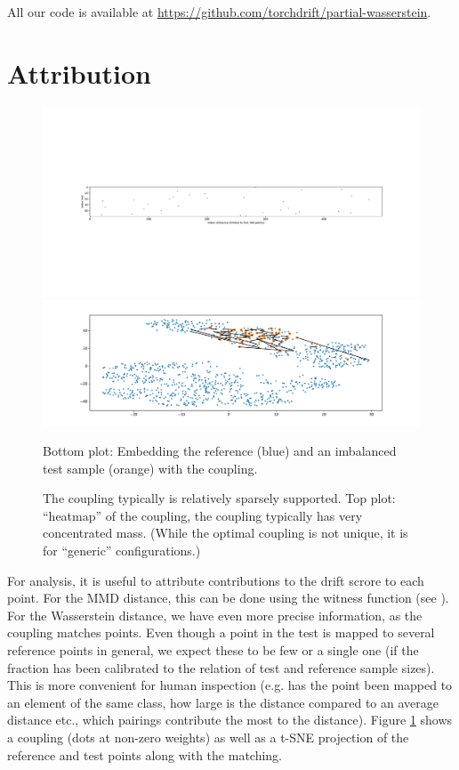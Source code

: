 \documentclass[a4paper,twoside,10pt]{article}
\theoremstyle{plain}
\theoremstyle{remark}
\begin{document}
All our code is available at \url{https://github.com/torchdrift/partial-wasserstein}.




\section{Attribution}

\begin{figure}
  \includegraphics[width=15cm]{experiment/v1/plot_coupling.pdf}
  \includegraphics[width=15cm]{experiment/v1/match_coupling.pdf}
  
  \caption{\label{fig:matching} The coupling typically is relatively sparsely supported. Top plot: ``heatmap'' of the coupling, the coupling typically has very concentrated mass. (While the optimal coupling is not unique, it is for ``generic'' configurations.)} Bottom plot: Embedding the reference (blue) and an imbalanced test sample (orange) with the coupling.
\end{figure}


For analysis, it is useful to attribute contributions to the drift scrore to each point. For the MMD distance, this can be done using the witness function (see \cite{Gretton}). For the Wasserstein distance, we have even more precise information, as the coupling matches points. Even though a point in the test is mapped to several reference points in general, we expect these to be few or a single one (if the fraction has been calibrated to the relation of test and reference sample sizes). This is more convenient for human inspection (e.g. has the point been mapped to an element of the same class, how large is the distance compared to an average distance etc., which pairings contribute the most to the distance).
Figure \ref{fig:matching} shows a coupling (dots at non-zero weights) as well as a t-SNE projection of the reference and test points along with the matching.
\end{document}
